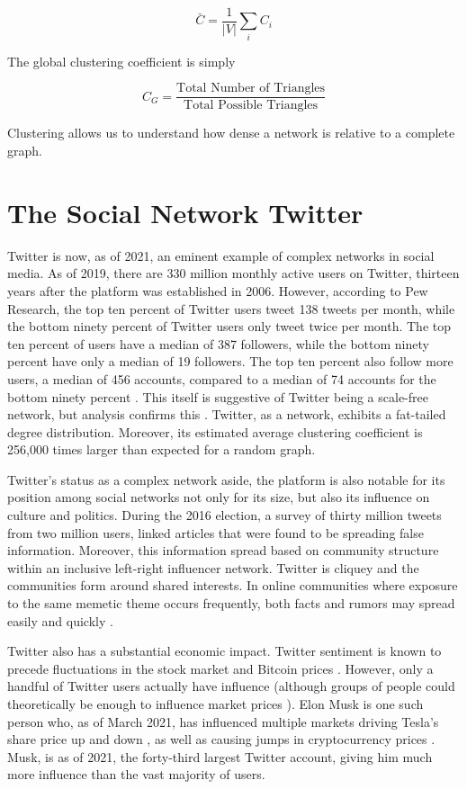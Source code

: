 $$
{\bar C} = \frac{1}{|V|}\sum_{i} C_i
$$

\noindent The global clustering coefficient is simply

$$
C_{G} = \frac{\text{Total Number of Triangles}}{\text{Total Possible Triangles}}
$$

\noindent Clustering allows us to understand how dense a network is relative to a complete graph. 

\section{The Social Network Twitter}
\label{section:Twitter}
Twitter is now, as of 2021, an eminent example of complex networks in social media.
As of 2019, there are 330 million monthly active users on Twitter, thirteen years after the platform was
established in 2006. However, according to Pew Research, the top ten percent of Twitter users tweet 138 
tweets per month, while the bottom ninety percent of Twitter users only tweet twice per month. The top ten percent of users
have a median of 387 followers, while the bottom ninety percent have only a median of 19 followers. The top ten percent
also follow more users, a median of 456 accounts, compared to a median of 74 accounts for the bottom ninety percent \cite{wojcik2019sizing}.
This itself is suggestive of Twitter being a scale-free network, but analysis confirms this \cite{Aparicio}. Twitter, as
a network, exhibits a fat-tailed degree distribution. Moreover, its estimated
average clustering coefficient is 256,000 times larger than expected for a random graph.

Twitter's status as a complex network aside, the platform is also notable for its position among social networks not only for its size,
but also its influence on culture and politics. During the 2016 election, a survey of
thirty million tweets from two million users, linked articles that were found to be spreading
false information. Moreover, this information spread based on community structure within an inclusive left-right
influencer network. Twitter is cliquey and the communities form around 
shared interests. In online communities where exposure to the same memetic theme occurs frequently, both
facts and rumors may spread easily and quickly \cite{bessi}.

Twitter also has a substantial economic impact. Twitter sentiment is known to precede fluctuations
in the stock market \cite{Bollen2011} and Bitcoin prices \cite{bitcoin}. However, only a handful of Twitter users actually have influence  
(although groups of people could theoretically be enough to influence market prices \cite{stonks}).
Elon Musk is one such person who, as of March 2021, has influenced multiple markets driving Tesla's share
price up and down \cite{elontweet}, as well as causing jumps in cryptocurrency prices  \cite{elontweet2} \cite{dogecoin}. Musk, 
is as of 2021, the forty-third largest Twitter account, giving him much more influence than the vast majority of users.

